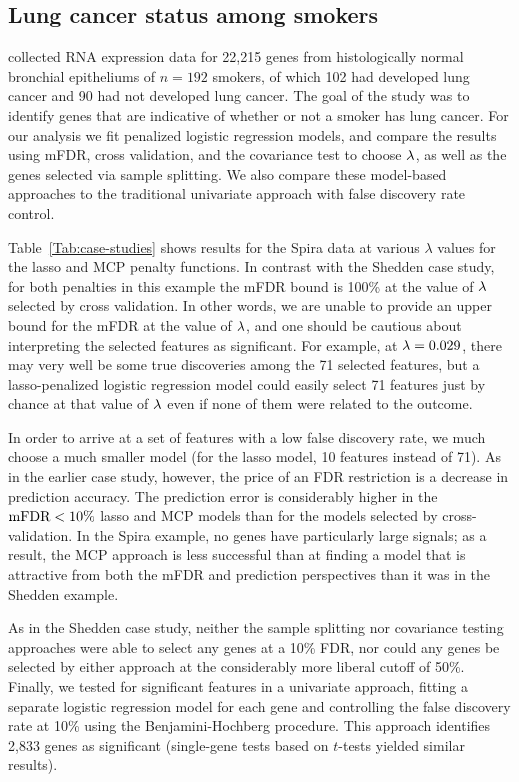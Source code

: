 \subsection{Lung cancer status among smokers}

\citet{Spira2007} collected RNA expression data for 22,215 genes from histologically normal bronchial epitheliums of $n = 192$ smokers, of which 102 had developed lung cancer and 90 had not developed lung cancer.
The goal of the study was to identify genes that are indicative of whether or not a smoker has lung cancer.  For our analysis we fit penalized logistic regression models, and compare the results using mFDR, cross validation, and the covariance test to choose $\lambda$, as well as the genes selected via sample splitting.   We also compare these model-based approaches to the traditional univariate approach with false discovery rate control.

Table~\ref{Tab:case-studies} shows results for the Spira data at various $\lambda$ values for the lasso and MCP penalty functions.  In contrast with the Shedden case study, for both penalties in this example the mFDR bound is 100\% at the value of $\lambda$ selected by cross validation.  In other words, we are unable to provide an upper bound for the mFDR at the value of $\lambda$, and one should be cautious about interpreting the selected features as significant.  For example, at $\lambda=0.029$, there may very well be some true discoveries among the 71 selected features, but a lasso-penalized logistic regression model could easily select 71 features just by chance at that value of $\lambda$ even if none of them were related to the outcome.

In order to arrive at a set of features with a low false discovery rate, we much choose a much smaller model (for the lasso model, 10 features instead of 71).  As in the earlier case study, however, the price of an FDR restriction is a decrease in prediction accuracy.  The prediction error is considerably higher in the $\textrm{mFDR} < 10\%$ lasso and MCP models than for the models selected by cross-validation.  In the Spira example, no genes have particularly large signals; as a result, the MCP approach is less successful than at finding a model that is attractive from both the mFDR and prediction perspectives than it was in the Shedden example.

As in the Shedden case study, neither the sample splitting nor covariance testing approaches were able to select any genes at a 10\% FDR, nor could any genes be selected by either approach at the considerably more liberal cutoff of 50\%.
Finally, we tested for significant features in a univariate approach, fitting a separate logistic regression model for each gene and controlling the false discovery rate at 10\% using the Benjamini-Hochberg procedure.
This approach identifies 2,833 genes as significant (single-gene tests based on $t$-tests yielded similar results).

